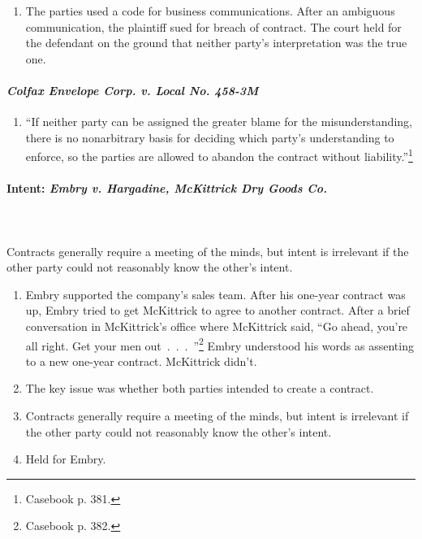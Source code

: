 \begin{enumerate}
    \item The parties used a code for business communications. After an 
    ambiguous communication, the plaintiff sued for breach of contract. The 
    court held for the defendant on the ground that neither party's 
    interpretation was the true one.
\end{enumerate}

\paragraph{\emph{Colfax Envelope Corp. v. Local No. 458-3M}}

\begin{enumerate}
    \item ``If neither party can be assigned the greater blame for the 
    misunderstanding, there is no nonarbitrary basis for deciding which 
    party's understanding to enforce, so the parties are allowed to abandon 
    the contract without liability.''\footnote{Casebook p. 381.}
\end{enumerate}

\paragraph{Intent: \emph{Embry v. Hargadine, McKittrick Dry Goods Co.}}
~\\\\
Contracts generally require a meeting of the minds, but intent is irrelevant 
if the other party could not reasonably know the other's intent.

\begin{enumerate}
    \item Embry supported the company's sales team. After his one-year 
    contract was up, Embry tried to get McKittrick to agree to another 
    contract. After a brief conversation in McKittrick's office where 
    McKittrick said, ``Go ahead, you're all right. Get your men 
    out~.~.~.~''\footnote{Casebook p. 382.} Embry understood his words as 
    assenting to a new one-year contract. McKittrick didn't.
    \item The key issue was whether both parties intended to create a 
    contract.
    \item Contracts generally require a meeting of the minds, but intent is 
    irrelevant if the other party could not reasonably know the other's 
    intent.
    \item Held for Embry.
\end{enumerate}


